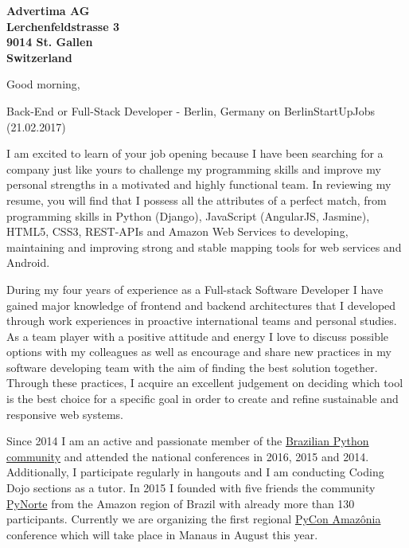 \documentclass[a4paper]{joaosoares-letter}
\begin{document}
\longindentation=0pt


\begin{letter}{\bfseries Advertima AG\\Lerchenfeldstrasse 3\\9014 St. Gallen\\Switzerland}


\date{Belém, \today}


\opening{Good morning,}{Back-End or Full-Stack Developer - Berlin, Germany on BerlinStartUpJobs (21.02.2017)}

I am excited to learn of your job opening because I have been searching for a company just like yours to challenge my programming skills and improve my personal strengths in a motivated and highly functional team. In reviewing my resume, you will find that I possess all the attributes of a perfect match, from programming skills in Python (Django), JavaScript (AngularJS, Jasmine), HTML5, CSS3,  REST-APIs and Amazon Web Services to developing, maintaining and improving strong and stable mapping tools for web services and Android.

During my four years of experience as a Full-stack Software Developer I have gained major knowledge of frontend and backend architectures that I developed through work experiences in proactive international teams and personal studies. As a team player with a positive attitude and energy I love to discuss possible options with my colleagues as well as encourage and share new practices in my software developing team with the aim of finding the best solution together. Through these practices, I acquire an excellent judgement on deciding which tool is the best choice for a specific goal in order to create and refine sustainable and responsive web systems.

Since 2014 I am an active and passionate member of the \href{http://python.org.br}{Brazilian Python community} and attended the national conferences in 2016, 2015 and 2014. Additionally, I participate regularly in hangouts and I am conducting Coding Dojo sections as a tutor. In 2015 I founded with five friends the community \href{http://pynorte.python.org.br}{PyNorte} from the Amazon region of Brazil with already more than 130 participants. Currently we are organizing the first regional \href{http://amazonia.python.org.br/}{PyCon Amazônia} conference which will take place in Manaus in August this year.


\end{letter}
\end{document}
